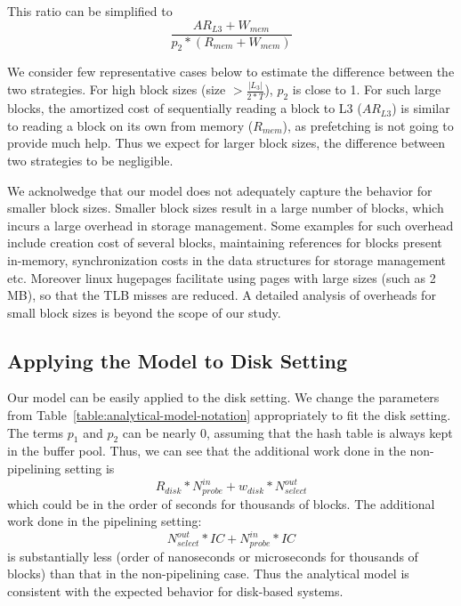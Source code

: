 This ratio can be simplified to 
\begin{equation*}
\frac{AR_{L3} + W_{mem} }{p_2 * (R_{mem} + W_{mem})}
\end{equation*}

We consider few representative cases below to estimate the difference between the two strategies.
For high block sizes (size $> \frac{|L_3|}{2 * T}$), $p_2$ is close to 1. 
For such large blocks, the amortized cost of sequentially reading a block to L3 ($AR_{L3}$) is similar to reading a block on its own from memory ($R_{mem}$), as prefetching is not going to provide much help. 
Thus we expect for larger block sizes, the difference between two strategies to be negligible. 

We acknolwedge that our model does not adequately capture the behavior for smaller block sizes.
Smaller block sizes result in a large number of blocks, which incurs a large overhead in storage management.
Some examples for such overhead include creation cost of several blocks, maintaining references for blocks present in-memory, synchronization costs in the data structures for storage management etc.
Moreover linux hugepages facilitate using pages with large sizes (such as 2 MB), so that the TLB misses are reduced.
A detailed analysis of overheads for small block sizes is beyond the scope of our study.

\subsection{Applying the Model to Disk Setting}\label{ssec:model-disk}
Our model can be easily applied to the disk setting. 
We change the parameters from Table~\ref{table:analytical-model-notation} appropriately to fit the disk setting.
The terms $p_1$ and $p_2$ can be nearly 0, assuming that the hash table is always kept in the buffer pool. 
Thus, we can see that the additional work done in the non-pipelining setting is 
\begin{equation*}
R_{disk} * N^{in}_{probe} +  w_{disk} * N^{out}_{select}
\end{equation*}
which could be in the order of seconds for thousands of blocks. 
The additional work done in the pipelining setting:
\begin{equation*}
N^{out}_{select} * IC + N^{in}_{probe} * IC
\end{equation*}
is substantially less (order of nanoseconds or microseconds for thousands of blocks) than that in the non-pipelining case.
Thus the analytical model is consistent with the expected behavior for disk-based systems. 

